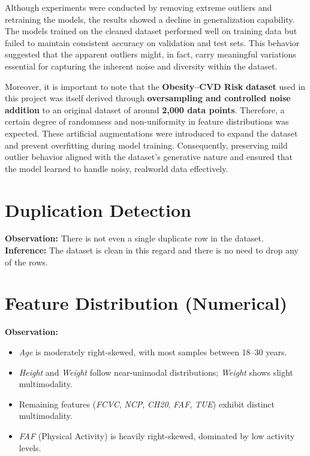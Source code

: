 Although experiments were conducted by removing extreme outliers and retraining the models, the results showed a decline in generalization capability.
The models trained on the cleaned dataset performed well on training data but failed to maintain consistent accuracy on validation and test sets.
This behavior suggested that the apparent outliers might, in fact, carry meaningful variations essential for capturing the inherent noise and diversity within the dataset.

Moreover, it is important to note that the \textbf{Obesity–CVD Risk} \textbf{dataset} used in this project was itself derived through \textbf{oversampling and controlled noise addition} to an original dataset of around \textbf{2,000 data points}.
Therefore, a certain degree of randomness and non-uniformity in feature distributions was expected.
These artificial augmentations were introduced to expand the dataset and prevent overfitting during model training.
Consequently, preserving mild outlier behavior aligned with the dataset’s generative nature and ensured that the model learned to handle noisy, realworld data effectively.



\section{Duplication Detection}\label{sec:duplication-detection}
\textbf{Observation:} There is not even a single duplicate row in the dataset.\\
\textbf{Inference:} The dataset is clean in this regard and there is no need to drop any of the rows.



\section{Feature Distribution (Numerical)}\label{sec:feature-distribution-numerical}

\textbf{Observation:}
\begin{itemize}
    \item \textit{Age} is moderately right-skewed, with most samples between 18–30 years.
    \item \textit{Height} and \textit{Weight} follow near-unimodal distributions; \textit{Weight} shows slight multimodality.
    \item Remaining features (\textit{FCVC}, \textit{NCP}, \textit{CH20}, \textit{FAF}, \textit{TUE}) exhibit distinct multimodality.
    \item \textit{FAF} (Physical Activity) is heavily right-skewed, dominated by low activity levels.
\end{itemize}

